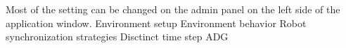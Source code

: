 \fleetControlAdminPanel
Most of the setting can be changed on the admin panel on the left side of the application window.
\sec Environment setup
\sec Environment behavior
\br\br
\sec Robot synchronization strategies
\secc Disctinct time step
\secc ADG
\picw=4cm
\picheight=4cm
\endmulti